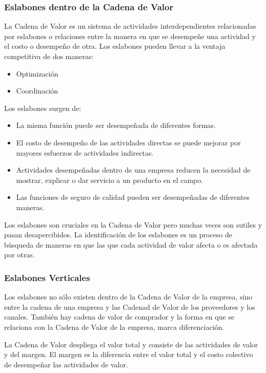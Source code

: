 \subsubsection*{Eslabones dentro de la Cadena de Valor}
La Cadena de Valor es un sistema de actividades interdependientes relacionadas por eslabones o relaciones entre la manera en que se desempeñe una actividad y el costo o desempeño de otra.
Los eslabones pueden llevar a la ventaja competitiva de dos maneras:
\begin{itemize}
	\item Optimización
	\item Coordinación
\end{itemize}
Los eslabones surgen de:
\begin{itemize}
	\item La misma función puede ser desempeñada de diferentes formas.
	\item El costo de desempeño de las actividades directas se puede mejorar por mayores esfuerzos de actividades indirectas.
	\item Actividades desempeñadas dentro de una empresa reducen la necesidad de mostrar, explicar o dar servicio a un producto en el campo.
	\item Las funciones de seguro de calidad pueden ser desempeñadas de diferentes maneras.
\end{itemize}
Los eslabones son cruciales en la Cadena de Valor pero muchas veces son sutiles y pasan desapercibidos.
La identificación de los eslabones es un proceso de búsqueda de maneras en que las que cada actividad de valor afecta o es afectada por otras.

\subsubsection*{Eslabones Verticales}
Los eslabones no sólo existen dentro de la Cadena de Valor de la empresa, sino entre la cadena de una empresa y las Cadenad de Valor de los proveedores y los canales.
También hay cadena de valor de comprador y la forma en que se relaciona con la Cadena de Valor de la empresa, marca diferenciación.

La Cadena de Valor despliega el valor total y consiste de las actividades de valor y del margen.
El margen es la diferencia entre el valor total y el costo colectivo de desempeñar las actividades de valor.

\newpage
